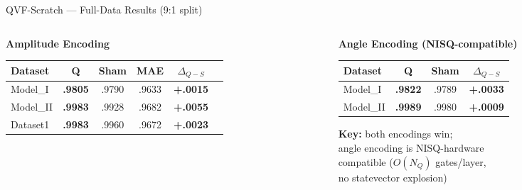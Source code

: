 \documentclass[aspectratio=169]{beamer}
\newcommand{\win}[1]{\textcolor{good}{\textbf{#1}}}
\newcommand{\qs}[1]{\textcolor{q}{\textbf{#1}}}
\begin{document}
\begin{frame}{QVF-Scratch — Full-Data Results (9:1 split)}
\begin{columns}
\begin{column}{0.52\textwidth}
\textbf{Amplitude Encoding}
\smallskip

\small
\begin{tabular}{@{}lccccc@{}}
\toprule
Dataset & \qs{Q} & Sham & MAE & $\Delta_{Q-S}$ \\
\midrule
Model\_I  & \win{.9805} & .9790 & .9633 & \win{+.0015} \\
Model\_II & \win{.9983} & .9928 & .9682 & \win{+.0055} \\
Dataset1  & \win{.9983} & .9960 & .9672 & \win{+.0023} \\
\bottomrule
\end{tabular}
\end{column}
\begin{column}{0.45\textwidth}
\textbf{Angle Encoding (NISQ-compatible)}
\smallskip

\small
\begin{tabular}{@{}lccc@{}}
\toprule
Dataset & \qs{Q} & Sham & $\Delta_{Q-S}$ \\
\midrule
Model\_I  & \win{.9822} & .9789 & \win{+.0033} \\
Model\_II & \win{.9989} & .9980 & \win{+.0009} \\
\bottomrule
\end{tabular}

\bigskip
\small
\textbf{Key:} both encodings win;\\
angle encoding is NISQ-hardware\\
compatible ($O(N_Q)$ gates/layer,\\
no statevector explosion)
\end{column}
\end{columns}
\end{frame}
\end{document}
